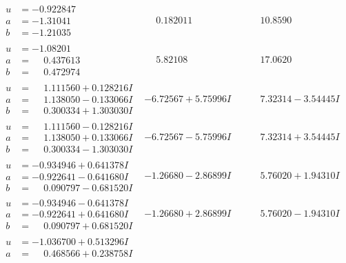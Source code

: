 \documentclass[1p]{elsarticle_modified}
\theoremstyle{definition}
\begin{document}
$$\begin{array}{c|c|c}
\begin{aligned}
u &= -0.922847\phantom{ +0.000000I} \\
a &= -1.31041\phantom{ +0.000000I} \\
b &= -1.21035\phantom{ +0.000000I}\end{aligned}
 & \phantom{-}0.182011\phantom{ +0.000000I} & \phantom{-}10.8590\phantom{ +0.000000I} \\ \hline\begin{aligned}
u &= -1.08201\phantom{ +0.000000I} \\
a &= \phantom{-}0.437613\phantom{ +0.000000I} \\
b &= \phantom{-}0.472974\phantom{ +0.000000I}\end{aligned}
 & \phantom{-}5.82108\phantom{ +0.000000I} & \phantom{-}17.0620\phantom{ +0.000000I} \\ \hline\begin{aligned}
u &= \phantom{-}1.111560 + 0.128216 I \\
a &= \phantom{-}1.138050 - 0.133066 I \\
b &= \phantom{-}0.300334 + 1.303030 I\end{aligned}
 & -6.72567 + 5.75996 I & \phantom{-}7.32314 - 3.54445 I \\ \hline\begin{aligned}
u &= \phantom{-}1.111560 - 0.128216 I \\
a &= \phantom{-}1.138050 + 0.133066 I \\
b &= \phantom{-}0.300334 - 1.303030 I\end{aligned}
 & -6.72567 - 5.75996 I & \phantom{-}7.32314 + 3.54445 I \\ \hline\begin{aligned}
u &= -0.934946 + 0.641378 I \\
a &= -0.922641 - 0.641680 I \\
b &= \phantom{-}0.090797 - 0.681520 I\end{aligned}
 & -1.26680 - 2.86899 I & \phantom{-}5.76020 + 1.94310 I \\ \hline\begin{aligned}
u &= -0.934946 - 0.641378 I \\
a &= -0.922641 + 0.641680 I \\
b &= \phantom{-}0.090797 + 0.681520 I\end{aligned}
 & -1.26680 + 2.86899 I & \phantom{-}5.76020 - 1.94310 I \\ \hline\begin{aligned}
u &= -1.036700 + 0.513296 I \\
a &= \phantom{-}0.468566 + 0.238758 I \\

\end{aligned}
\end{array}$$
\end{document}
